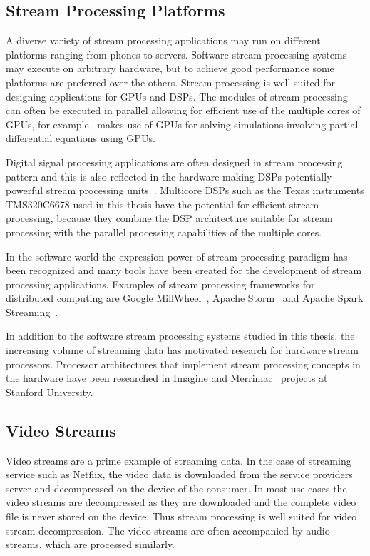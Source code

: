 \subsection{Stream Processing Platforms}
\label{subsec:stream-processing-platforms}
A diverse variety of stream processing applications may run on different platforms ranging from phones to servers. Software stream processing systems may execute on arbitrary hardware, but to achieve good performance some platforms are preferred over the others. Stream processing is well suited for designing applications for GPUs and DSPs. The modules of stream processing can often be executed in parallel allowing for efficient use of the multiple cores of GPUs, for example~\cite{goddeke2011fast} makes use of GPUs for solving simulations involving partial differential equations using GPUs.

Digital signal processing applications are often designed in stream processing pattern and this is also reflected in the hardware making DSPs potentially powerful stream processing units~\cite{lee2015introduction}. Multicore DSPs such as the Texas instruments TMS320C6678 used in this thesis have the potential for efficient stream processing, because they combine the DSP architecture suitable for stream processing with the parallel processing capabilities of the multiple cores.

In the software world the expression power of stream processing paradigm has been recognized and many tools have been created for the development of stream processing applications. Examples of stream processing frameworks for distributed computing are Google MillWheel~\cite{tyler2013millwheel}, Apache Storm~\cite{apache2016storm} and Apache Spark Streaming~\cite{apache2016spark}. 

In addition to the software stream processing systems studied in this thesis, the increasing volume of streaming data has motivated research for hardware stream processors. Processor architectures that implement stream processing concepts in the hardware have been researched in Imagine \cite{kapasi2002imagine} and Merrimac~\cite{dally2003merrimac} projects at Stanford University.

\subsection{Video Streams}
\label{subsec:video-streams}
Video streams are a prime example of streaming data. In the case of streaming service such as Netflix, the video data is downloaded from the service providers server and decompressed on the device of the consumer. In most use cases the video streams are decompressed as they are downloaded and the complete video file is never stored on the device. Thus stream processing is well suited for video stream decompression. The video streams are often accompanied by audio streams, which are processed similarly.~\cite{richardson2002video}

